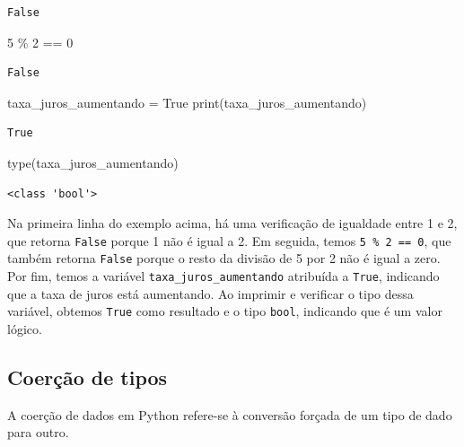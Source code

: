 \documentclass[
  portuguese,
  letterpaper,
  DIV=11,
  numbers=noendperiod]{scrreprt}
\newenvironment{Shaded}{\begin{snugshade}}{\end{snugshade}}
\newcommand{\BuiltInTok}[1]{\textcolor[rgb]{0.00,0.23,0.31}{#1}}
\newcommand{\DecValTok}[1]{\textcolor[rgb]{0.68,0.00,0.00}{#1}}
\newcommand{\NormalTok}[1]{\textcolor[rgb]{0.00,0.23,0.31}{#1}}
\newcommand{\OperatorTok}[1]{\textcolor[rgb]{0.37,0.37,0.37}{#1}}
\newcommand{\VariableTok}[1]{\textcolor[rgb]{0.07,0.07,0.07}{#1}}
\theoremstyle{definition}
\theoremstyle{remark}
\begin{document}
\begin{verbatim}
False
\end{verbatim}

\begin{Shaded}
\begin{Highlighting}[]
\DecValTok{5} \OperatorTok{\%} \DecValTok{2} \OperatorTok{==} \DecValTok{0}
\end{Highlighting}
\end{Shaded}

\begin{verbatim}
False
\end{verbatim}

\begin{Shaded}
\begin{Highlighting}[]
\NormalTok{taxa\_juros\_aumentando }\OperatorTok{=} \VariableTok{True}
\BuiltInTok{print}\NormalTok{(taxa\_juros\_aumentando)}
\end{Highlighting}
\end{Shaded}

\begin{verbatim}
True
\end{verbatim}

\begin{Shaded}
\begin{Highlighting}[]
\BuiltInTok{type}\NormalTok{(taxa\_juros\_aumentando)}
\end{Highlighting}
\end{Shaded}

\begin{verbatim}
<class 'bool'>
\end{verbatim}

Na primeira linha do exemplo acima, há uma verificação de igualdade
entre 1 e 2, que retorna \texttt{False} porque 1 não é igual a 2. Em
seguida, temos \texttt{5\ \%\ 2\ ==\ 0}, que também retorna
\texttt{False} porque o resto da divisão de 5 por 2 não é igual a zero.
Por fim, temos a variável \texttt{taxa\_juros\_aumentando} atribuída a
\texttt{True}, indicando que a taxa de juros está aumentando. Ao
imprimir e verificar o tipo dessa variável, obtemos \texttt{True} como
resultado e o tipo \texttt{bool}, indicando que é um valor lógico.

\subsection{Coerção de tipos}\label{coeruxe7uxe3o-de-tipos}

A coerção de dados em Python refere-se à conversão forçada de um tipo de
dado para outro.
\end{document}
